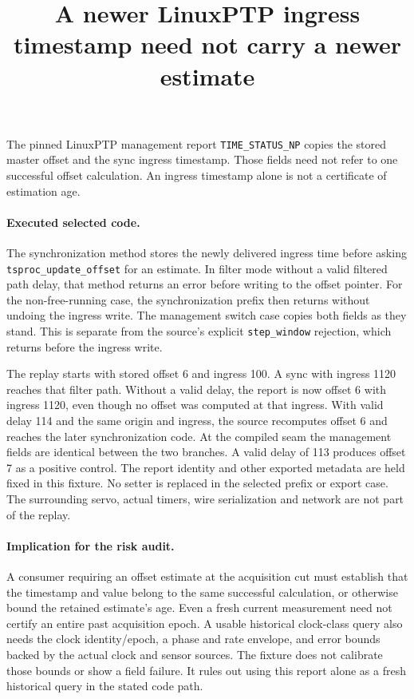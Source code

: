 \documentclass[11pt]{article}
\title{A newer LinuxPTP ingress timestamp need not carry a newer estimate}
\begin{document}
\maketitle

The pinned LinuxPTP management report \texttt{TIME\_STATUS\_NP}
copies the stored master offset and the sync ingress timestamp.
Those fields need not refer to one successful offset calculation.
An ingress timestamp alone is not a certificate of estimation age.

\paragraph{Executed selected code.}
The synchronization method stores the newly delivered ingress time
before asking \texttt{tsproc\_update\_offset} for an estimate.
In filter mode without a valid filtered path delay, that method
returns an error before writing to the offset pointer. For the
non-free-running case, the synchronization prefix then returns
without undoing the ingress write. The management switch case
copies both fields as they stand. This is separate from the
source's explicit \texttt{step\_window} rejection, which returns
before the ingress write.

The replay starts with stored offset 6 and ingress 100. A sync
with ingress 1120 reaches that filter path. Without a valid delay,
the report is now offset 6 with ingress 1120, even though no offset
was computed at that ingress. With valid delay 114 and the same
origin and ingress, the source recomputes offset 6 and reaches
the later synchronization code. At the compiled seam the
management fields are identical between the two branches.
A valid delay of 113 produces offset 7 as a positive control.
The report identity and other exported metadata are held fixed
in this fixture. No setter is replaced in the selected prefix
or export case. The surrounding servo, actual timers, wire
serialization and network are not part of the replay.

\paragraph{Implication for the risk audit.}
A consumer requiring an offset estimate at the acquisition cut
must establish that the timestamp and value belong to the same
successful calculation, or otherwise bound the retained estimate's
age. Even a fresh current measurement need not certify an entire
past acquisition epoch. A usable historical clock-class query
also needs the clock identity/epoch, a phase and rate envelope,
and error bounds backed by the actual clock and sensor sources.
The fixture does not calibrate those bounds or show a field
failure. It rules out using this report alone as a fresh historical
query in the stated code path.
\end{document}
